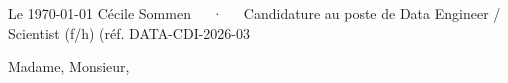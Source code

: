 \documentclass[11pt, a4paper]{awesome-cv}
\begin{document}
\makecvheader[L]

\makecvfooter
  {Le \today}
  {Cécile Sommen~~~·~~~Candidature au poste de Data Engineer / Scientist (f/h) (réf. DATA-CDI-2026-03}
  {}

\makelettertitle

\begin{cvletter}


\vspace{0.5ex}

Madame, Monsieur,

\vspace{0.5ex}


\end{cvletter}
\end{document}
